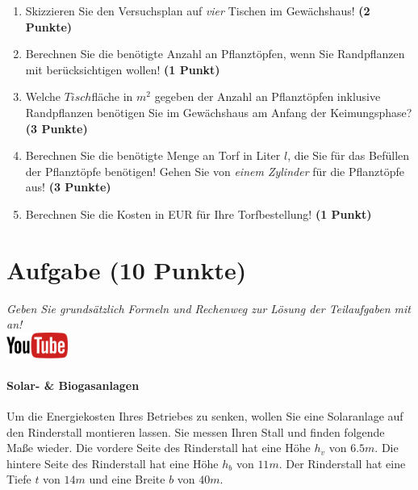 \documentclass[a4paper, 9pt]{scrartcl}\usepackage[]{graphicx}\usepackage[]{xcolor}
\begin{document}
\begin{enumerate}
\item Skizzieren Sie den Versuchsplan auf \textit{vier} Tischen im
  Gew{\"a}chshaus! \textbf{(2 Punkte)}
\item Berechnen Sie die ben{\"o}tigte Anzahl an Pflanzt{\"o}pfen, wenn Sie
  Randpflanzen mit ber{\"u}cksichtigen wollen! \textbf{(1 Punkt)}
\item Welche $Tisch$fl{\"a}che in $m^2$ gegeben der Anzahl an
  Pflanzt{\"o}pfen inklusive Randpflanzen ben{\"o}tigen Sie im Gew{\"a}chshaus am
  Anfang der Keimungsphase?  \textbf{(3 Punkte)}
\item Berechnen Sie die ben{\"o}tigte Menge an Torf in Liter $l$, die Sie f{\"u}r
  das Bef{\"u}llen der Pflanzt{\"o}pfe ben{\"o}tigen! Gehen Sie von \textit{einem
    Zylinder} f{\"u}r die Pflanzt{\"o}pfe aus!  \textbf{(3 Punkte)}
\item Berechnen Sie die Kosten in EUR f{\"u}r Ihre Torfbestellung! \textbf{(1
    Punkt)}
\end{enumerate}



 
\clearpage

\section{Aufgabe \hfill (10 Punkte)}

\textit{Geben Sie grunds{\"a}tzlich Formeln und Rechenweg zur L{\"o}sung der
  Teilaufgaben mit an!} \\[1Ex]

\hfill\href{https://youtu.be/aBxLkdF-c4M}{\includegraphics[width =
  2cm]{img/youtube}} %
\hspace{2Ex}

\paragraph{Solar- \& Biogasanlagen}



Um die Energiekosten Ihres Betriebes zu senken, wollen Sie eine Solaranlage
auf den Rinderstall montieren lassen. Sie messen Ihren Stall und finden
folgende Ma{\ss}e wieder. Die vordere Seite des Rinderstall hat eine H{\"o}he
$h_v$ von $6.5m$. Die hintere Seite des Rinderstall hat eine
H{\"o}he $h_b$ von $11m$. Der Rinderstall hat eine Tiefe $t$ von
$14m$ und eine Breite $b$ von $40m$.
\end{document}

